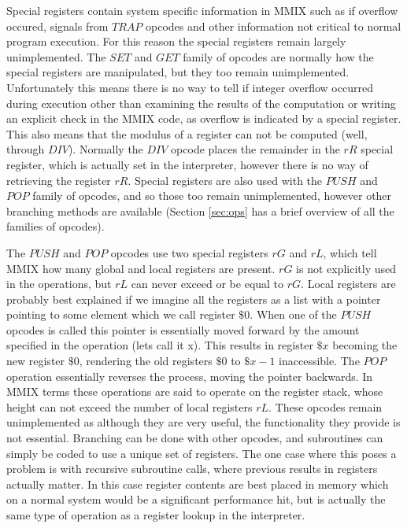 \documentclass[conference]{IEEEtran}
\begin{document}
Special registers contain system specific information in MMIX such as if overflow occured, signals from $TRAP$ opcodes and other information not critical to normal program execution. For this reason the special registers remain largely unimplemented. The $SET$ and $GET$ family of opcodes are normally how the special registers are manipulated, but they too remain unimplemented. Unfortunately this means there is no way to tell if integer overflow occurred during execution other than examining the results of the computation or writing an explicit check in the MMIX code, as overflow is indicated by a special register. This also means that the modulus of a register can not be computed (well, through $DIV$). Normally the $DIV$ opcode places the remainder in the $rR$ special register, which is actually set in the interpreter, however there is no way of retrieving the register $rR$. Special registers are also used with the $PUSH$ and $POP$ family of opcodes, and so those too remain unimplemented, however other branching methods are available (Section \ref{sec:ops} has a brief overview of all the families of opcodes). 

The $PUSH$ and $POP$ opcodes use two special registers $rG$ and $rL$, which tell MMIX how many global and local registers are present. $rG$ is not explicitly used in the operations, but $rL$ can never exceed or be equal to $rG$. Local registers are probably best explained if we imagine all the registers as a list with a pointer pointing to some element which we call register $\$0$. When one of the $PUSH$ opcodes is called this pointer is essentially moved forward by the amount specified in the operation (lets call it x). This results in register $\$x$ becoming the new register $\$0$, rendering the old registers $\$0$ to $\$x-1$ inaccessible. The $POP$ operation essentially reverses the process, moving the pointer backwards. In MMIX terms these operations are said to operate on the register stack, whose height can not exceed the number of local registers $rL$. These opcodes remain unimplemented as although they are very useful, the functionality they provide is not essential. Branching can be done with other opcodes, and subroutines can simply be coded to use a unique set of registers. The one case where this poses a problem is with recursive subroutine calls, where previous results in registers actually matter. In this case register contents are best placed in memory which on a normal system would be a significant performance hit, but is actually the same type of operation as a register lookup in the interpreter.
\end{document}
